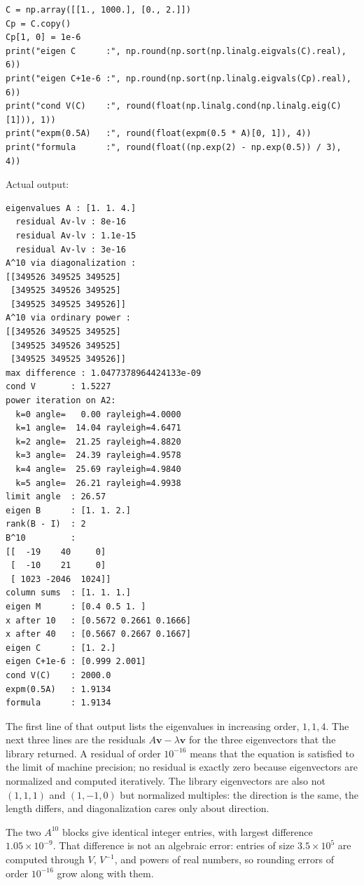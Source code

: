 \begin{lab}
\begin{verbatim}
C = np.array([[1., 1000.], [0., 2.]])
Cp = C.copy()
Cp[1, 0] = 1e-6
print("eigen C      :", np.round(np.sort(np.linalg.eigvals(C).real), 6))
print("eigen C+1e-6 :", np.round(np.sort(np.linalg.eigvals(Cp).real), 6))
print("cond V(C)    :", round(float(np.linalg.cond(np.linalg.eig(C)[1])), 1))
print("expm(0.5A)   :", round(float(expm(0.5 * A)[0, 1]), 4))
print("formula      :", round(float((np.exp(2) - np.exp(0.5)) / 3), 4))
\end{verbatim}
Actual output:
\begin{verbatim}
eigenvalues A : [1. 1. 4.]
  residual Av-lv : 8e-16
  residual Av-lv : 1.1e-15
  residual Av-lv : 3e-16
A^10 via diagonalization :
[[349526 349525 349525]
 [349525 349526 349525]
 [349525 349525 349526]]
A^10 via ordinary power :
[[349526 349525 349525]
 [349525 349526 349525]
 [349525 349525 349526]]
max difference : 1.0477378964424133e-09
cond V       : 1.5227
power iteration on A2:
  k=0 angle=   0.00 rayleigh=4.0000
  k=1 angle=  14.04 rayleigh=4.6471
  k=2 angle=  21.25 rayleigh=4.8820
  k=3 angle=  24.39 rayleigh=4.9578
  k=4 angle=  25.69 rayleigh=4.9840
  k=5 angle=  26.21 rayleigh=4.9938
limit angle  : 26.57
eigen B      : [1. 1. 2.]
rank(B - I)  : 2
B^10         :
[[  -19    40     0]
 [  -10    21     0]
 [ 1023 -2046  1024]]
column sums  : [1. 1. 1.]
eigen M      : [0.4 0.5 1. ]
x after 10   : [0.5672 0.2661 0.1666]
x after 40   : [0.5667 0.2667 0.1667]
eigen C      : [1. 2.]
eigen C+1e-6 : [0.999 2.001]
cond V(C)    : 2000.0
expm(0.5A)   : 1.9134
formula      : 1.9134
\end{verbatim}
\end{lab}

The first line of that output lists the eigenvalues in increasing order, $1,1,4$. The next three
lines are the residuals $A\mathbf{v}-\lambda\mathbf{v}$ for the three eigenvectors that the library
returned. A residual of order $10^{-16}$ means that the equation is satisfied to the limit of
machine precision; no residual is exactly zero because eigenvectors are normalized and computed
iteratively. The library eigenvectors are also not $(1,1,1)$ and $(1,-1,0)$ but normalized
multiples: the direction is the same, the length differs, and diagonalization cares only about
direction.

The two $A^{10}$ blocks give identical integer entries, with largest difference
$1.05\times10^{-9}$. That difference is not an algebraic error: entries of size
$3.5\times10^{5}$ are computed through $V$, $V^{-1}$, and powers of real numbers, so rounding
errors of order $10^{-16}$ grow along with them.

